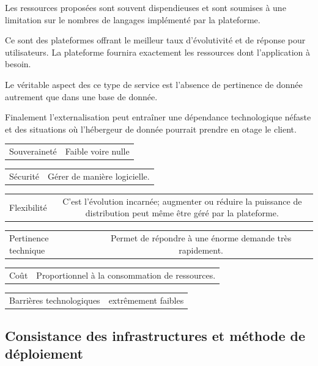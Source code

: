 \documentclass[11pt, a4paper ]{article}
\begin{document}
\begin{spacing}{1.5}
Les ressources proposées sont souvent dispendieuses et sont soumises à une limitation sur le nombres de langages implémenté par la plateforme.

Ce sont des plateformes offrant le meilleur taux d'évolutivité et de réponse pour utilisateurs. La plateforme fournira exactement les ressources dont l'application à besoin.

Le véritable aspect des ce type de service est l'absence de pertinence de donnée autrement que dans une base de donnée.

Finalement l'externalisation peut entraîner une dépendance technologique néfaste et des situations où l'hébergeur de donnée pourrait prendre en otage le client.

\begin{center}
	\begin{tabular}{| l | c | }
		Souveraineté & Faible voire nulle\\
	\end{tabular}
	\begin{tabular}{| l | c | }
		Sécurité & Gérer de manière logicielle.\\
	\end{tabular}
	\begin{tabular}{| l | c | }
		Flexibilité & C'est l'évolution incarnée; augmenter ou réduire la puissance de distribution peut même être géré par la plateforme.\\
	\end{tabular}
	\begin{tabular}{| l | c | }
		Pertinence technique & Permet de répondre à une énorme demande très rapidement.\\
	\end{tabular}
	\begin{tabular}{| l | c | }
		Coût & Proportionnel à la consommation de ressources.\\
	\end{tabular}
	\begin{tabular}{| l | c | }
		Barrières technologiques &  extrêmement faibles\\
	\end{tabular}
\end{center}


			\subsection{Consistance des infrastructures et méthode de déploiement}


\end{spacing}
\end{document}
